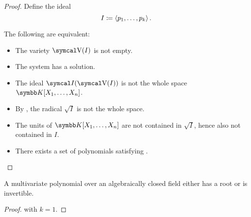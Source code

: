 \begin{proof}
  Define the ideal
  \begin{equation*}
    I \coloneqq \left\langle p_1, \ldots, p_k \right\rangle.
  \end{equation*}

  The following are equivalent:
  \begin{itemize}
    \item The variety \( \CV(I) \) is not empty.
    \item The system  has a solution.
    \item The ideal \( \Cal{I}(\CV(I)) \) is not the whole space \( \BK[X_1, \ldots, X_n] \).
    \item By , the radical \( \sqrt I \) is not the whole space.
    \item The units of \( \BK[X_1, \ldots, X_n] \) are not contained in \( \sqrt I \), hence also not contained in \( I \).
    \item There exists a set of polynomials satisfying .
  \end{itemize}
\end{proof}

\begin{corollary}\label{thm:polynomial_over_closed_field_is_either_invertible_or_has_root}
  A multivariate polynomial over an algebraically closed field either has a root or is invertible.
\end{corollary}
\begin{proof}
   with \( k = 1 \).
\end{proof}
